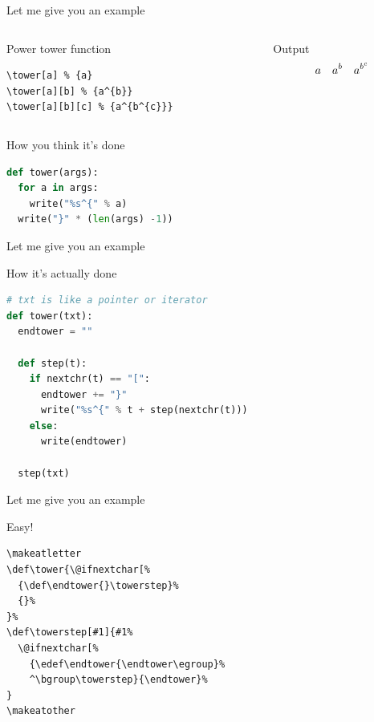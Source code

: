 \documentclass[xetex, onlymath, handout]{beamer}
\begin{document}
\begin{frame}[fragile]{Let me give you an example}
  \begin{columns}
    \begin{column}{.6\linewidth}
      \begin{block}{Power tower function}
        \begin{lstlisting}
\tower[a] % {a}
\tower[a][b] % {a^{b}}
\tower[a][b][c] % {a^{b^{c}}}
        \end{lstlisting}
      \end{block}
    \end{column}
    \begin{column}{.4\linewidth}
      \begin{exampleblock}{Output}
        \Large
        \[
          \tower[a] \quad
          \tower[a][b] \quad
          \tower[a][b][c]
        \]
      \end{exampleblock}
    \end{column}
  \end{columns}
  \begin{block}{How you think it's done}
    \begin{lstlisting}[language=python]
def tower(args):
  for a in args:
    write("%s^{" % a)
  write("}" * (len(args) -1))
    \end{lstlisting}
  \end{block}
\end{frame}

\begin{frame}[fragile]{Let me give you an example}
  \begin{block}{How it's actually done}
    \begin{lstlisting}[language=python]
# txt is like a pointer or iterator
def tower(txt):
  endtower = ""

  def step(t):
    if nextchr(t) == "[":
      endtower += "}"
      write("%s^{" % t + step(nextchr(t)))
    else:
      write(endtower)

  step(txt)
    \end{lstlisting}
  \end{block}
\end{frame}

\begin{frame}[fragile]{Let me give you an example}
  \begin{block}{Easy!}
    \begin{lstlisting}
\makeatletter
\def\tower{\@ifnextchar[%
  {\def\endtower{}\towerstep}%
  {}%
}%
\def\towerstep[#1]{#1%
  \@ifnextchar[%
    {\edef\endtower{\endtower\egroup}%
    ^\bgroup\towerstep}{\endtower}%
}
\makeatother
    \end{lstlisting}
  \end{block}
\end{frame}
\end{document}
